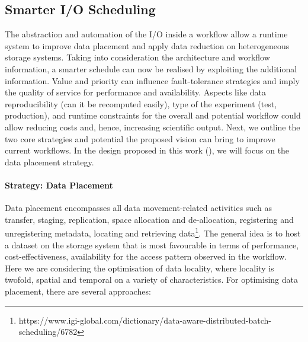 \documentclass{superfri}
\begin{document}

\subsection{Smarter I/O Scheduling}

The abstraction and automation of the I/O inside a workflow allow a runtime system to improve data placement and apply data reduction on heterogeneous storage systems.
Taking into consideration the architecture and workflow information, a smarter schedule can now be realised by exploiting the additional information.
Value and priority can influence fault-tolerance strategies and imply the quality of service for performance and availability.
Aspects like data reproducibility (can it be recomputed easily), type of the experiment (test, production), and runtime constraints for the overall and potential workflow could allow reducing costs and, hence, increasing scientific output.
Next, we outline the two core strategies and potential the proposed vision can bring to improve current workflows.
In the design proposed in this work (), we will focus on the data placement strategy.

\paragraph{Strategy: Data Placement}

Data placement encompasses all data movement-related activities such as transfer, staging, replication, space allocation and de-allocation, registering and unregistering metadata, locating and retrieving data\footnote{https://www.igi-global.com/dictionary/data-aware-distributed-batch-scheduling/6782}.
The general idea is to host a dataset on the storage system that is most favourable in terms of performance, cost-effectiveness, availability for the access pattern observed in the workflow.
Here we are considering the optimisation of data locality, where locality is twofold, spatial and temporal on a variety of characteristics.
For optimising data placement, there are several approaches:
\end{document}
